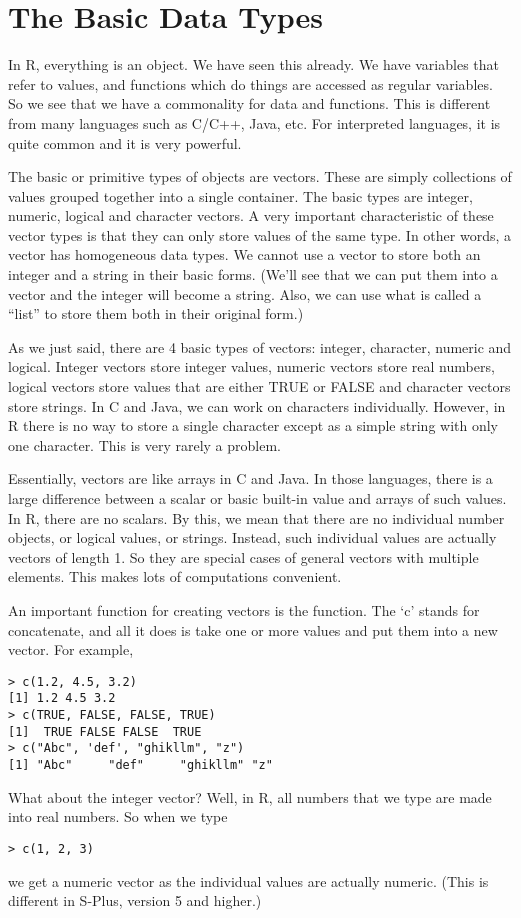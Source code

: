 \section{The Basic Data Types}
In R, everything is an object. We have seen this already. We have
variables that refer to values, and functions which do things are
accessed as regular variables. So we see that we have a commonality
for data and functions. This is different from many languages such as
C/C++, Java, etc. For interpreted languages, it is quite common and it
is very powerful.

The basic or primitive types of objects are vectors. These are simply
collections of values grouped together into a single container. The
basic types are integer, numeric, logical and character vectors. A
very important characteristic of these vector types is that they can
only store values of the same type. In other words, a vector has
homogeneous data types. We cannot use a vector to store both an
integer and a string in their basic forms. (We'll see that we can put
them into a vector and the integer will become a string. Also, we can
use what is called a ``list'' to store them both in their original
form.)

As we just said, there are 4 basic types of vectors: integer,
character, numeric and logical. Integer vectors store integer values,
numeric vectors store real numbers, logical vectors store values that
are either TRUE or FALSE and character vectors store strings. In C and
Java, we can work on characters individually. However, in R there is
no way to store a single character except as a simple string with only
one character. This is very rarely a problem.

Essentially, vectors are like arrays in C and Java. In those
languages, there is a large difference between a scalar or basic
built-in value and arrays of such values. In R, there are no
scalars. By this, we mean that there are no individual number objects,
or logical values, or strings. Instead, such individual values are
actually vectors of length 1. So they are special cases of general
vectors with multiple elements. This makes lots of computations
convenient.

An important function for creating vectors is the 
function. The `c' stands for concatenate, and all it does is take one
or more values and put them into a new vector. For example,
\begin{verbatim}
> c(1.2, 4.5, 3.2)
[1] 1.2 4.5 3.2
> c(TRUE, FALSE, FALSE, TRUE)
[1]  TRUE FALSE FALSE  TRUE
> c("Abc", 'def', "ghikllm", "z")
[1] "Abc"     "def"     "ghikllm" "z"      
\end{verbatim}
What about the integer vector? Well, in R, all numbers that we type
are made into real numbers. So when we type
\begin{verbatim}
> c(1, 2, 3)
\end{verbatim}
we get a numeric vector as the individual values are actually
numeric. (This is different in S-Plus, version 5 and higher.)


